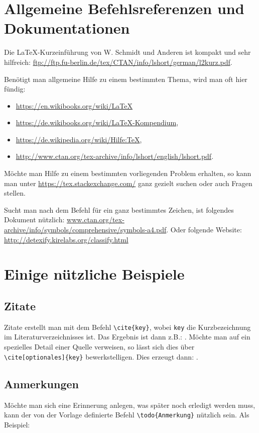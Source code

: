 \section{Allgemeine Befehlsreferenzen und Dokumentationen}
Die LaTeX-Kurzeinführung von W. Schmidt und Anderen ist kompakt und sehr hilfreich: \url{ftp://ftp.fu-berlin.de/tex/CTAN/info/lshort/german/l2kurz.pdf}.

Benötigt man allgemeine Hilfe zu einem bestimmten Thema, wird man oft hier fündig:

\begin{itemize}
 \item \url{https://en.wikibooks.org/wiki/LaTeX}
 \item \url{https://de.wikibooks.org/wiki/LaTeX-Kompendium},
 \item \url{https://de.wikipedia.org/wiki/Hilfe:TeX},
 \item \url{http://www.ctan.org/tex-archive/info/lshort/english/lshort.pdf}.
\end{itemize}

Möchte man Hilfe zu einem bestimmten vorliegenden Problem erhalten, so kann man unter \url{https://tex.stackexchange.com/} ganz gezielt suchen oder auch Fragen stellen.

Sucht man nach dem Befehl für ein ganz bestimmtes Zeichen, ist folgendes 
Dokument nützlich: 
\url{www.ctan.org/tex-archive/info/symbols/comprehensive/symbols-a4.pdf}. Oder 
folgende Website: \url{http://detexify.kirelabs.org/classify.html}

\section{Einige nützliche Beispiele}
\subsection{Zitate}
Zitate erstellt man mit dem Befehl \verb|\cite{key}|, wobei \verb|key| die Kurzbezeichnung im Literaturverzeichnisses ist. Das Ergebnis ist dann z.B.: \cite{EKS07}. Möchte man auf ein spezielles Detail einer Quelle verweisen, so lässt sich dies über \verb|\cite[optionales]{key}| bewerkstelligen. Dies erzeugt dann: \cite[S. 42]{EKS07}.

\subsection{Anmerkungen}
Möchte man sich eine Erinnerung anlegen, was später noch erledigt werden muss, kann der von der Vorlage definierte Befehl \verb|\todo{Anmerkung}| nützlich sein. Als Beispiel:

